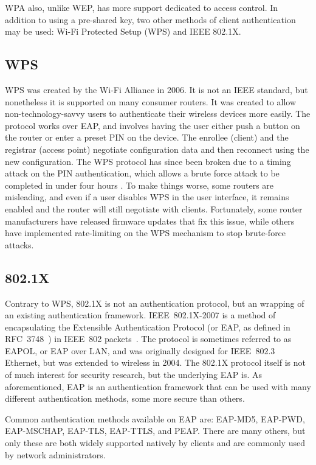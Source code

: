 \documentclass[journal, compsoc]{IEEEtran}
\begin{document}
WPA also, unlike WEP, has more support dedicated to access control. In
addition to using a pre-shared key, two other methods of client
authentication may be used: Wi-Fi Protected Setup (WPS) and IEEE
802.1X.

\subsection{WPS}
\label{sec:overview-wps}

WPS was created by the Wi-Fi Alliance in 2006. It is not an IEEE
standard, but nonetheless it is supported on many consumer routers. It
was created to allow non-technology-savvy users to authenticate their
wireless devices more easily. The protocol works over EAP, and
involves having the user either push a button on the router or enter a
preset PIN on the device. The enrollee (client) and the registrar
(access point) negotiate configuration data and then reconnect using
the new configuration. The WPS protocol has since been broken due to a
timing attack on the PIN authentication, which allows a brute force
attack to be completed in under four hours
\cite{viehbock2011brute}. To make things worse, some routers are
misleading, and even if a user disables WPS in the user interface, it
remains enabled and the router will still negotiate with
clients. Fortunately, some router manufacturers have released firmware
updates that fix this issue, while others have implemented
rate-limiting on the WPS mechanism to stop brute-force attacks.

\subsection{802.1X}
\label{sec:overview-8021x}

Contrary to WPS, 802.1X is not an authentication protocol, but an
wrapping of an existing authentication framework. IEEE~802.1X-2007 is
a method of encapsulating the Extensible Authentication Protocol (or
EAP, as defined in RFC~3748~\cite{aboba2004extensible}) in IEEE~802
packets~\cite{1438730}. The protocol is sometimes referred to as
EAPOL, or EAP over LAN, and was originally designed for IEEE~802.3
Ethernet, but was extended to wireless in 2004. The 802.1X protocol
itself is not of much interest for security research, but the
underlying EAP is. As aforementioned, EAP is an authentication
framework that can be used with many different authentication methods,
some more secure than others.

Common authentication methods available on EAP are: EAP-MD5, EAP-PWD,
EAP-MSCHAP, EAP-TLS, EAP-TTLS, and PEAP\@. There are many others, but
only these are both widely supported natively by clients and are
commonly used by network administrators.
\end{document}
